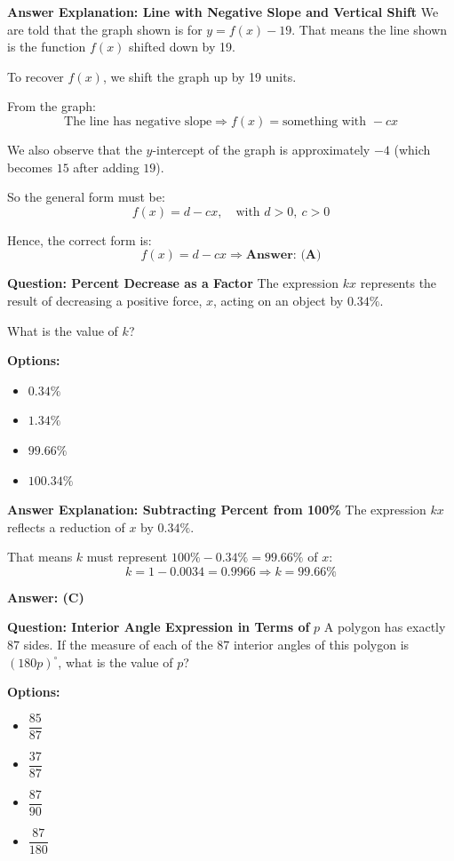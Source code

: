 \documentclass{beamer}
\begin{document}
\begin{frame}{\textbf{Answer Explanation: Line with Negative Slope and Vertical Shift}}
\small
We are told that the graph shown is for $y = f(x) - 19$. That means the line shown is the function $f(x)$ shifted down by 19.

To recover $f(x)$, we shift the graph up by 19 units.

From the graph:
\[
\text{The line has negative slope} \Rightarrow f(x) = \text{something with } -cx
\]

We also observe that the $y$-intercept of the graph is approximately $-4$ (which becomes $15$ after adding $19$).

So the general form must be:
\[
f(x) = d - cx, \quad \text{with } d > 0,\ c > 0
\]

Hence, the correct form is:
\[
\boxed{f(x) = d - cx}
\Rightarrow \textbf{Answer: (A)}
\]
\end{frame}


\begin{frame}{\textbf{Question: Percent Decrease as a Factor}}
\small
The expression $kx$ represents the result of decreasing a positive force, $x$, acting on an object by $0.34\%$.

What is the value of $k$?

\textbf{Options:}
\begin{itemize}
    \item[(A)] $0.34\%$
    \item[(B)] $1.34\%$
    \item[(C)] $99.66\%$
    \item[(D)] $100.34\%$
\end{itemize}
\end{frame}


\begin{frame}{\textbf{Answer Explanation: Subtracting Percent from 100\%}}
\small
The expression $kx$ reflects a reduction of $x$ by $0.34\%$.

That means $k$ must represent $100\% - 0.34\% = 99.66\%$ of $x$:
\[
k = 1 - 0.0034 = 0.9966
\Rightarrow \boxed{k = 99.66\%}
\]

\textbf{Answer: (C)}
\end{frame}


\begin{frame}{\textbf{Question: Interior Angle Expression in Terms of } $p$}
\small
A polygon has exactly 87 sides. If the measure of each of the 87 interior angles of this polygon is $(180p)^\circ$, what is the value of $p$?

\textbf{Options:}
\begin{itemize}
    \item[(A)] $\dfrac{85}{87}$
    \item[(B)] $\dfrac{37}{87}$
    \item[(C)] $\dfrac{87}{90}$
    \item[(D)] $\dfrac{87}{180}$
\end{itemize}
\end{frame}
\end{document}
